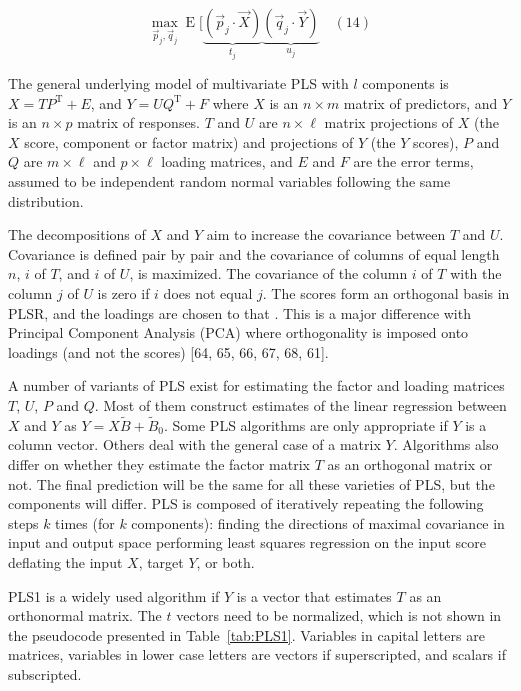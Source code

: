 \documentclass[preprint,12pt]{elsarticle}
\begin{document}
\begin{equation}
	\max_{{\vec{p}}_{j},{\vec{q}}_{j}}\operatorname{E} [\underbrace{({\vec{p}}_{j}\cdot {\vec{X}})}_{t_{j}}\underbrace{({\vec{q}}_{j}\cdot {\vec{Y}})}_{u_{j}}
	\quad\left(14\right)
\end{equation}

The general underlying model of multivariate PLS with $l$ components is $X=TP^{\mathrm{T}}+E$, and $Y=UQ^{\mathrm{T}}+F$ where $X$ is an $n\times m$ matrix of predictors, and $Y$ is an $n\times p$ matrix of responses. $T$ and $U$ are $n\times \ell$ matrix projections of $X$ (the $X$ score, component or factor matrix) and projections of $Y$ (the $Y$ scores), $P$ and $Q$ are $m\times \ell $ and $p\times \ell $ loading matrices, and $E$ and $F$ are the error terms, assumed to be independent random normal variables following the same distribution.

The decompositions of $X$ and $Y$ aim to increase the covariance between $T$ and $U$. Covariance is defined pair by pair and the covariance of columns of equal length $n$, $i$ of $T$, and $i$ of $U$, is maximized. The covariance of the column $i$ of $T$ with the column $j$ of $U$ is zero if $i$ does not equal $j$.
The scores form an orthogonal basis in PLSR, and the loadings are chosen to that . This is a major difference with Principal Component Analysis (PCA) where orthogonality is imposed onto loadings (and not the scores) [64, 65, 66, 67, 68, 61].

A number of variants of PLS exist for estimating the factor and loading matrices $T$, $U$, $P$ and $Q$. Most of them construct estimates of the linear regression between $X$ and $Y$ as $Y=X{\tilde{B}}+{\tilde{B}}_{0}$. Some PLS algorithms are only appropriate if $Y$ is a column vector. Others deal with the general case of a matrix $Y$. Algorithms also differ on whether they estimate the factor matrix $T$ as an orthogonal matrix or not. The final prediction will be the same for all these varieties of PLS, but the components will differ.
PLS is composed of iteratively repeating the following steps $k$ times (for $k$ components):
finding the directions of maximal covariance in input and output space performing least squares regression on the input score deflating the input $X$, target $Y$, or both.

PLS1 is a widely used algorithm if $Y$ is a vector that estimates $T$ as an orthonormal matrix. The $t$ vectors need to be normalized, which is not shown in the pseudocode presented in Table~\ref{tab:PLS1}. Variables in capital letters are matrices, variables in lower case letters are vectors if superscripted, and scalars if subscripted.
\end{document}
